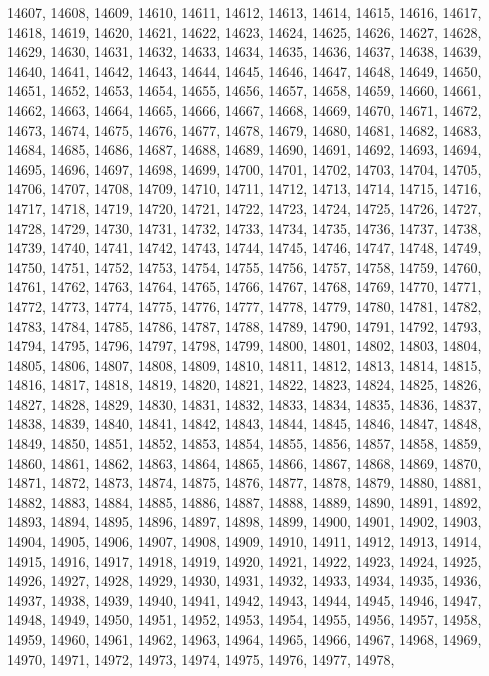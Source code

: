 14607,
14608,
14609,
14610,
14611,
14612,
14613,
14614,
14615,
14616,
14617,
14618,
14619,
14620,
14621,
14622,
14623,
14624,
14625,
14626,
14627,
14628,
14629,
14630,
14631,
14632,
14633,
14634,
14635,
14636,
14637,
14638,
14639,
14640,
14641,
14642,
14643,
14644,
14645,
14646,
14647,
14648,
14649,
14650,
14651,
14652,
14653,
14654,
14655,
14656,
14657,
14658,
14659,
14660,
14661,
14662,
14663,
14664,
14665,
14666,
14667,
14668,
14669,
14670,
14671,
14672,
14673,
14674,
14675,
14676,
14677,
14678,
14679,
14680,
14681,
14682,
14683,
14684,
14685,
14686,
14687,
14688,
14689,
14690,
14691,
14692,
14693,
14694,
14695,
14696,
14697,
14698,
14699,
14700,
14701,
14702,
14703,
14704,
14705,
14706,
14707,
14708,
14709,
14710,
14711,
14712,
14713,
14714,
14715,
14716,
14717,
14718,
14719,
14720,
14721,
14722,
14723,
14724,
14725,
14726,
14727,
14728,
14729,
14730,
14731,
14732,
14733,
14734,
14735,
14736,
14737,
14738,
14739,
14740,
14741,
14742,
14743,
14744,
14745,
14746,
14747,
14748,
14749,
14750,
14751,
14752,
14753,
14754,
14755,
14756,
14757,
14758,
14759,
14760,
14761,
14762,
14763,
14764,
14765,
14766,
14767,
14768,
14769,
14770,
14771,
14772,
14773,
14774,
14775,
14776,
14777,
14778,
14779,
14780,
14781,
14782,
14783,
14784,
14785,
14786,
14787,
14788,
14789,
14790,
14791,
14792,
14793,
14794,
14795,
14796,
14797,
14798,
14799,
14800,
14801,
14802,
14803,
14804,
14805,
14806,
14807,
14808,
14809,
14810,
14811,
14812,
14813,
14814,
14815,
14816,
14817,
14818,
14819,
14820,
14821,
14822,
14823,
14824,
14825,
14826,
14827,
14828,
14829,
14830,
14831,
14832,
14833,
14834,
14835,
14836,
14837,
14838,
14839,
14840,
14841,
14842,
14843,
14844,
14845,
14846,
14847,
14848,
14849,
14850,
14851,
14852,
14853,
14854,
14855,
14856,
14857,
14858,
14859,
14860,
14861,
14862,
14863,
14864,
14865,
14866,
14867,
14868,
14869,
14870,
14871,
14872,
14873,
14874,
14875,
14876,
14877,
14878,
14879,
14880,
14881,
14882,
14883,
14884,
14885,
14886,
14887,
14888,
14889,
14890,
14891,
14892,
14893,
14894,
14895,
14896,
14897,
14898,
14899,
14900,
14901,
14902,
14903,
14904,
14905,
14906,
14907,
14908,
14909,
14910,
14911,
14912,
14913,
14914,
14915,
14916,
14917,
14918,
14919,
14920,
14921,
14922,
14923,
14924,
14925,
14926,
14927,
14928,
14929,
14930,
14931,
14932,
14933,
14934,
14935,
14936,
14937,
14938,
14939,
14940,
14941,
14942,
14943,
14944,
14945,
14946,
14947,
14948,
14949,
14950,
14951,
14952,
14953,
14954,
14955,
14956,
14957,
14958,
14959,
14960,
14961,
14962,
14963,
14964,
14965,
14966,
14967,
14968,
14969,
14970,
14971,
14972,
14973,
14974,
14975,
14976,
14977,
14978,
